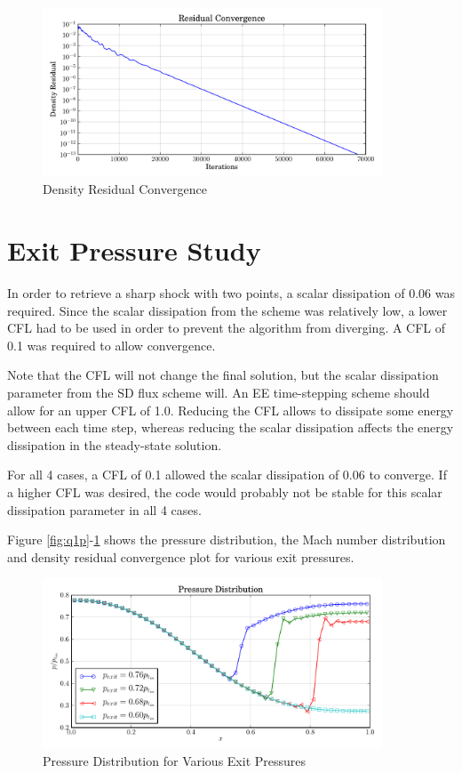 \documentclass[letterpaper,12pt,]{article}
\begin{document}
\begin{figure}[!ht]
    \centering
    \includegraphics[width = 0.9\textwidth]{./figures/q1c.pdf}
    \caption {Density Residual Convergence}
    \label{fig:q1c}
\end{figure}

\section{Exit Pressure Study}

In order to retrieve a sharp shock with two points, a scalar dissipation of 0.06 was required.
Since the scalar dissipation from the scheme was relatively low, a lower CFL had to be used in order to prevent the algorithm from diverging.
A CFL of 0.1 was required to allow convergence.

Note that the CFL will not change the final solution, but the scalar dissipation parameter from the SD flux scheme will.
An EE time-stepping scheme should allow for an upper CFL of 1.0.
Reducing the CFL allows to dissipate some energy between each time step, whereas reducing the scalar dissipation affects the energy dissipation in the steady-state solution.

For all 4 cases, a CFL of 0.1 allowed the scalar dissipation of 0.06 to converge.
If a higher CFL was desired, the code would probably not be stable for this scalar dissipation parameter in all 4 cases.

Figure \ref{fig:q1p}-\ref{fig:q1c} shows the pressure distribution, the Mach number distribution and density residual convergence plot for various exit pressures.

\begin{figure}[!ht]
    \centering
    \includegraphics[width = 0.9\textwidth]{./figures/q2p.pdf}
    \caption {Pressure Distribution for Various Exit Pressures}
    \label{fig:q2p}
\end{figure}
\end{document}
